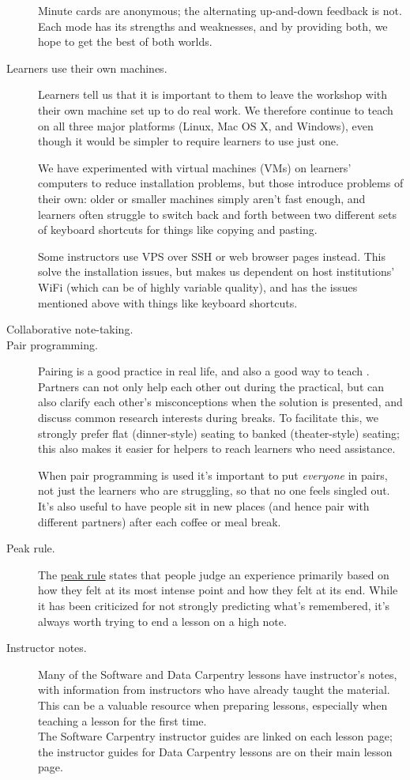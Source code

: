 \begin{description}
Minute cards are anonymous; the alternating up-and-down feedback is not.
Each mode has its strengths and weaknesses, and by providing both, we
hope to get the best of both worlds.
\item[Learners use their own machines.]
Learners tell us that it is important to them to leave the workshop with
their own machine set up to do real work. We therefore continue to teach
on all three major platforms (Linux, Mac OS X, and Windows), even though
it would be simpler to require learners to use just one.

We have experimented with virtual machines (VMs) on learners' computers
to reduce installation problems, but those introduce problems of their
own: older or smaller machines simply aren't fast enough, and learners
often struggle to switch back and forth between two different sets of
keyboard shortcuts for things like copying and pasting.

Some instructors use VPS over SSH or web browser pages instead. This
solve the installation issues, but makes us dependent on host
institutions' WiFi (which can be of highly variable quality), and has
the issues mentioned above with things like keyboard shortcuts.

\item[Collaborative note-taking.]

\item[Pair programming.]
Pairing is a good practice in real life, and also a
good way to teach \cite{bib:porter-what-works}. Partners can not only help each other out during the
practical, but can also clarify each other's misconceptions when the
solution is presented, and discuss common research interests during
breaks. To facilitate this, we strongly prefer flat (dinner-style)
seating to banked (theater-style) seating; this also makes it easier for
helpers to reach learners who need assistance.

When pair programming is used it's important to put \emph{everyone} in
pairs, not just the learners who are struggling, so that no one feels
singled out. It's also useful to have people sit in new places (and
hence pair with different partners) after each coffee or meal break.
\item[Peak rule.]
The \href{https://en.wikipedia.org/wiki/Peak\%E2\%80\%93end\_rule}{peak
rule} states that people judge an experience primarily based on how they
felt at its most intense point and how they felt at its end. While it
has been criticized for not strongly predicting what's remembered, it's
always worth trying to end a lesson on a high note.
\item[Instructor notes.]
Many of the Software and Data Carpentry lessons have instructor's notes,
with information from instructors who have already taught the material.
This can be a valuable resource when preparing lessons, especially when
teaching a lesson for the first time.\\The Software Carpentry instructor
guides are linked on each lesson page; the instructor guides for Data
Carpentry lessons are on their
main lesson page.
\end{description}

